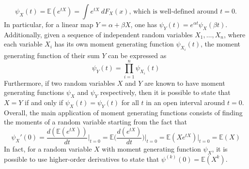 \documentclass{report}
\begin{document}
\[\psi_X(t) = \mathbb{E}(e^{tX}) = \int e^{tX} \ dF_X(x) \text{, which is well-defined around $t = 0$.}\]
In particular, for a linear map $\displaystyle Y = \alpha + \beta X$, one has $\displaystyle \psi_Y(t) = e^{\alpha t}\psi_X(\beta t)$. \newline
Additionally, given a sequence of independent random variables $\displaystyle X_1, \dots, X_n$, where each variable $\displaystyle X_i$ has its own moment generating function $\displaystyle \psi_{X_i}(t)$, the moment generating function of their sum $\displaystyle Y$ can be expressed as
\[\psi_Y(t) = \prod_{i = 1}^n \psi_{X_i}(t)\]
Furthermore, if two random variables $\displaystyle X$ and $\displaystyle Y$ are known to have moment generating functions $\displaystyle \psi_X$ and $\displaystyle \psi_Y$ respectively, then it is possible to state that $\displaystyle X = Y$ if and only if $\displaystyle \psi_X(t) = \psi_Y(t)$ for all $\displaystyle t$ in an open interval around $\displaystyle t = 0$. \newline
Overall, the main application of moment generating functions consists of finding the moments of a random variable starting from the fact that
\[\psi_X'(0) = \frac{d(\mathbb{E}(e^{tX}))}{dt}\Bigg|_{t = 0} = \mathbb{E}\Bigg(\frac{d(e^{tX})}{dt}\Bigg)\Bigg|_{t = 0} = \mathbb{E}(Xe^{tX})\Bigg|_{t = 0} = \mathbb{E}(X)\]
In fact, for a random variable $\displaystyle X$ with moment generating function $\displaystyle \psi_X$, it is possible to use higher-order derivatives to state that $\displaystyle \psi^{(k)}(0) = \mathbb{E}(X^k)$.
\end{document}
